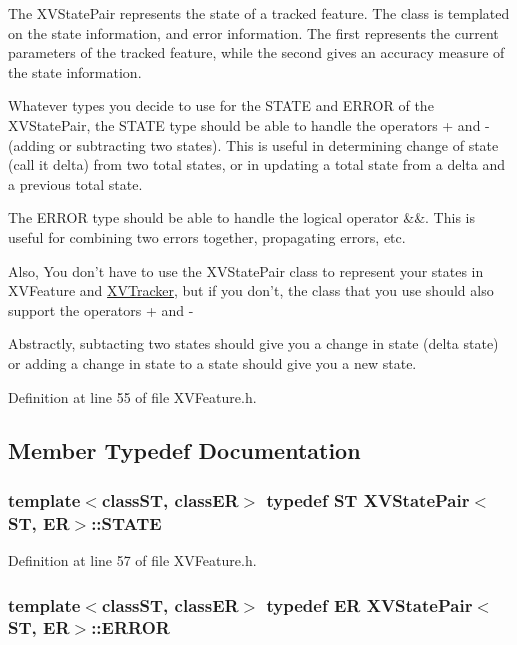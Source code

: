 The XVState\-Pair represents the state of a tracked feature. The class is templated on the state information, and error information. The first represents the current parameters of the tracked feature, while the second gives an accuracy measure of the state information.

Whatever types you decide to use for the STATE and ERROR of the XVState\-Pair, the STATE type should be able to handle the operators + and - (adding or subtracting two states). This is useful in determining change of state (call it delta) from two total states, or in updating a total state from a delta and a previous total state.

The ERROR type should be able to handle the logical operator \&\&. This is useful for combining two errors together, propagating errors, etc.

Also, You don't have to use the XVState\-Pair class to represent your states in XVFeature and \hyperlink{class_XVTracker}{XVTracker}, but if you don't, the class that you use should also support the operators + and -

Abstractly, subtacting two states should give you a change in  state (delta state) or adding a change in state to a state  should give you a new state. 



Definition at line 55 of file XVFeature.h.

\subsection{Member Typedef Documentation}
\label{XVStatePair_u0}
\hypertarget{class_XVStatePair_u0}{
\subsubsection[STATE]{\setlength{\rightskip}{0pt plus 5cm}template$<$classST, classER$>$ typedef ST XVState\-Pair$<$ST, ER$>$::STATE}}




Definition at line 57 of file XVFeature.h.\label{XVStatePair_u1}
\hypertarget{class_XVStatePair_u1}{
\subsubsection[ERROR]{\setlength{\rightskip}{0pt plus 5cm}template$<$classST, classER$>$ typedef ER XVState\-Pair$<$ST, ER$>$::ERROR}}




